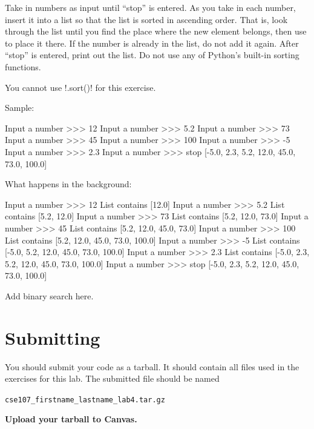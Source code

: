 \documentclass[11pt]{cselabheader}
\begin{document}
\begin{ex}[sorted.py] Take in numbers as input until ``stop'' is entered. As you
  take in each number, insert it into a list so that the list is sorted in
  ascending order. That is, look through the list until you find the place where
  the new element belongs, then use  to place it there.
  If the number is already in the list, do not add it again. After ``stop'' is
  entered, print out the list. Do not use any of Python's built-in sorting
  functions.

  You cannot use \pythoninline!.sort()! for this exercise.

  Sample:

  \begin{verbatimcode}
Input a number >>> 12
Input a number >>> 5.2
Input a number >>> 73
Input a number >>> 45
Input a number >>> 100
Input a number >>> -5
Input a number >>> 2.3
Input a number >>> stop
[-5.0, 2.3, 5.2, 12.0, 45.0, 73.0, 100.0]
  \end{verbatimcode}

  What happens in the background:

  \begin{verbatimcode}
Input a number >>> 12
List contains [12.0]
Input a number >>> 5.2
List contains [5.2, 12.0]
Input a number >>> 73
List contains [5.2, 12.0, 73.0]
Input a number >>> 45
List contains [5.2, 12.0, 45.0, 73.0]
Input a number >>> 100
List contains [5.2, 12.0, 45.0, 73.0, 100.0]
Input a number >>> -5
List contains [-5.0, 5.2, 12.0, 45.0, 73.0, 100.0]
Input a number >>> 2.3
List contains [-5.0, 2.3, 5.2, 12.0, 45.0, 73.0, 100.0]
Input a number >>> stop
[-5.0, 2.3, 5.2, 12.0, 45.0, 73.0, 100.0]
  \end{verbatimcode}

\end{ex}

\begin{ex}[binary.py]
  Add binary search here.
\end{ex}



\pagebreak
\section{Submitting}

You should submit your code as a tarball. It should contain all files
used in the exercises for this lab. The submitted file should be named
\begin{center}
  \texttt{cse107\_firstname\_lastname\_lab4.tar.gz}
\end{center}

\begin{center}
  \textbf{Upload your tarball to Canvas.}
\end{center}

\listoftheorems
\end{document}
